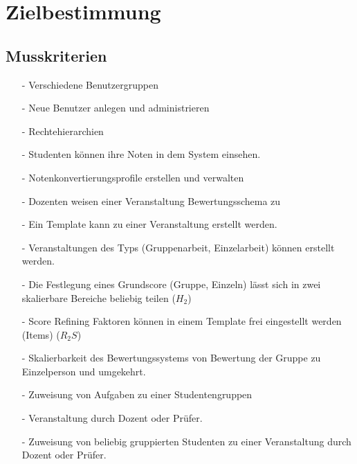 


	
	\tableofcontents
	\listoftables
	\listoffigures
	
	
	\begin{versionhistory}
	\end{versionhistory}
	
\clearpage

	\section{Zielbestimmung}
		\subsection{Musskriterien}			

			
			\begin{itemize}
			\item[-]	Verschiedene Benutzergruppen
			\item[-]	Neue Benutzer anlegen und administrieren 
			\item[-]	Rechtehierarchien
			\item[-]	Studenten können ihre Noten in dem System einsehen.
			\item[-]	Notenkonvertierungsprofile erstellen und verwalten
			\item[-]	Dozenten weisen einer Veranstaltung Bewertungsschema zu
			\item[-]	Ein Template kann zu einer Veranstaltung erstellt werden.
			\item[-]	Veranstaltungen des Typs (Gruppenarbeit, Einzelarbeit) können erstellt werden.
			\item[-]	Die Festlegung eines Grundscore (Gruppe, Einzeln) lässt sich in zwei skalierbare \newline Bereiche beliebig teilen ($H_2$)
			\item[-]	Score Refining Faktoren können in einem Template frei eingestellt werden (Items) ($R_2S$)
			\item[-]	Skalierbarkeit des Bewertungssystems von Bewertung der Gruppe zu Einzelperson und umgekehrt.

			\item[-]	Zuweisung von Aufgaben zu einer Studentengruppen
			\item[-]	Veranstaltung durch Dozent oder Prüfer.				

			\item[-]	Zuweisung von beliebig gruppierten Studenten zu einer Veranstaltung durch Dozent oder Prüfer.				

			\end{itemize}

